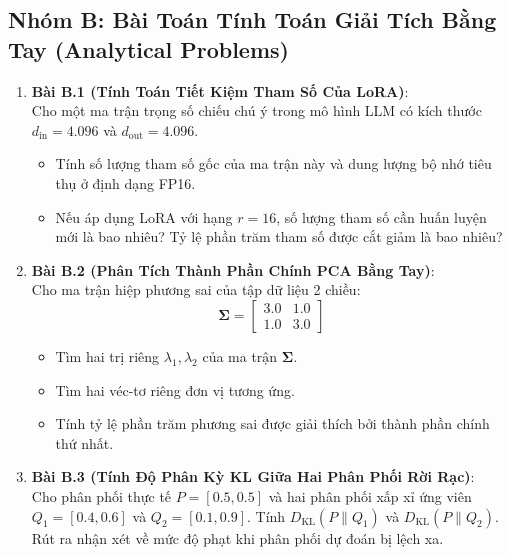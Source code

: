 \subsection{Nhóm B: Bài Toán Tính Toán Giải Tích Bằng Tay (Analytical Problems)}
\begin{enumerate}
  \item \textbf{Bài B.1 (Tính Toán Tiết Kiệm Tham Số Của LoRA)}: \\
  Cho một ma trận trọng số chiếu chú ý trong mô hình LLM có kích thước $d_{\text{in}} = 4.096$ và $d_{\text{out}} = 4.096$.
  \begin{itemize}
    \item[a)] Tính số lượng tham số gốc của ma trận này và dung lượng bộ nhớ tiêu thụ ở định dạng FP16.
    \item[b)] Nếu áp dụng LoRA với hạng $r = 16$, số lượng tham số cần huấn luyện mới là bao nhiêu? Tỷ lệ phần trăm tham số được cắt giảm là bao nhiêu?
  \end{itemize}

  \item \textbf{Bài B.2 (Phân Tích Thành Phần Chính PCA Bằng Tay)}: \\
  Cho ma trận hiệp phương sai của tập dữ liệu 2 chiều:
  \begin{equation*}
  \mathbf{\Sigma} = \begin{bmatrix} 3.0 & 1.0 \\ 1.0 & 3.0 \end{bmatrix}
  \end{equation*}
  \begin{itemize}
    \item[a)] Tìm hai trị riêng $\lambda_1, \lambda_2$ của ma trận $\mathbf{\Sigma}$.
    \item[b)] Tìm hai véc-tơ riêng đơn vị tương ứng.
    \item[c)] Tính tỷ lệ phần trăm phương sai được giải thích bởi thành phần chính thứ nhất.
  \end{itemize}

  \item \textbf{Bài B.3 (Tính Độ Phân Kỳ KL Giữa Hai Phân Phối Rời Rạc)}: \\
  Cho phân phối thực tế $P = [0.5, 0.5]$ và hai phân phối xấp xỉ ứng viên $Q_1 = [0.4, 0.6]$ và $Q_2 = [0.1, 0.9]$.
  Tính $D_{\text{KL}}(P \parallel Q_1)$ và $D_{\text{KL}}(P \parallel Q_2)$. Rút ra nhận xét về mức độ phạt khi phân phối dự đoán bị lệch xa.
\end{enumerate}

